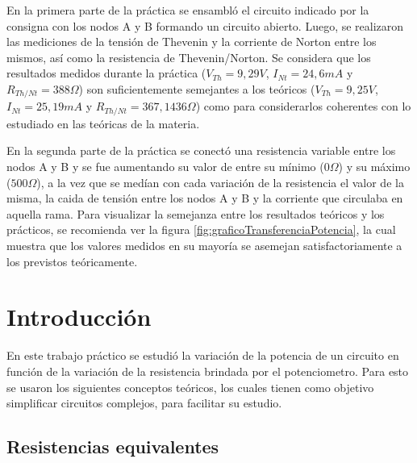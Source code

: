 \documentclass{article}
\begin{document}
    \vspace{0.5cm} 
        En la primera parte de la práctica se ensambló el circuito indicado por la consigna con los nodos A y B formando un circuito abierto. Luego, se
        realizaron las mediciones de la tensión de Thevenin y la corriente de Norton entre los mismos, así como la resistencia de Thevenin/Norton. 
        Se considera que los resultados medidos durante la práctica ($V_{Th} = 9,29V$, $I_{Nt} = 24,6 mA$ y $R_{Th/Nt} = 388 \Omega$) son suficientemente 
        semejantes a los teóricos ($V_{Th} = 9,25 V$, $I_{Nt} = 25,19 mA$ y $R_{Th/Nt} = 367,1436 \Omega$) como para considerarlos coherentes con lo 
        estudiado en las teóricas de la materia.  \par
    \vspace{0.5cm} 
        En la segunda parte de la práctica se conectó una resistencia variable entre los nodos A y B y se fue aumentando su valor de entre su mínimo 
        ($0 \Omega$) y su máximo ($500 \Omega$), a la vez que se medían con cada variación de la resistencia el valor de la misma, la caida de
        tensión entre los nodos A y B y la corriente que circulaba en aquella rama. Para visualizar la semejanza entre los resultados teóricos y los 
        prácticos, se recomienda ver la figura \ref{fig:graficoTransferenciaPotencia}, la cual muestra que los valores medidos en su mayoría se asemejan
        satisfactoriamente a los previstos teóricamente. \par



    \newpage

    \tableofcontents %
    \newpage

    \section{Introducción}

        En este trabajo práctico se estudió la variación de la potencia de un circuito en función de la variación de la resistencia brindada por el potenciometro. 
        Para esto se usaron los siguientes conceptos teóricos, los cuales tienen como objetivo simplificar circuitos complejos, para facilitar su estudio.

        \subsection{Resistencias equivalentes}
\end{document}
